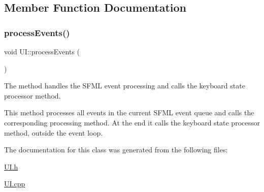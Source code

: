 \subsection{Member Function Documentation}
\mbox{\label{class_u_i_a440e133dbf19d82b8b40809644494068}} 
\subsubsection{\texorpdfstring{process\+Events()}{processEvents()}}
{\footnotesize\ttfamily void U\+I\+::process\+Events (\begin{DoxyParamCaption}{ }\end{DoxyParamCaption})}



The method handles the S\+F\+ML event processing and calls the keyboard state processor method. 

This method processes all events in the current S\+F\+ML event queue and calls the corresponding processing method. At the end it calls the keyboard state processor method, outside the event loop. 

The documentation for this class was generated from the following files\+:\begin{DoxyCompactItemize}
\item 
\hyperlink{_u_i_8h}{U\+I.\+h}\item 
\hyperlink{_u_i_8cpp}{U\+I.\+cpp}\end{DoxyCompactItemize}
